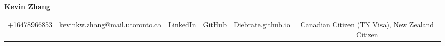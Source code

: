 \documentclass{article}
\begin{document}
    \fontsize{9}{15}
    \selectfont
    \begin{center}
        \begin{center}
            \huge\bfseries Kevin Zhang
        \end{center}
            \begin{tabular}{c|c|c|c|c|c}
                \href{tel:+16478966853}{+16478966853} &
                \href{mailto:kevinkw.zhang@mail.utoronto.ca}{kevinkw.zhang@mail.utoronto.ca} & 
                \href{https://www.linkedin.com/in/kevin-zhang-uoft/}{LinkedIn} & 
                \href{https://github.com/diebrate/}{GitHub} &
                \href{https://diebrate.github.io/}{Diebrate.github.io} &
                Canadian Citizen (TN Visa), New Zealand Citizen
        \end{tabular}
    \end{center}    
    \vspace{-0.75em}
    
    
    
    
    
    
    
  
\end{document}
